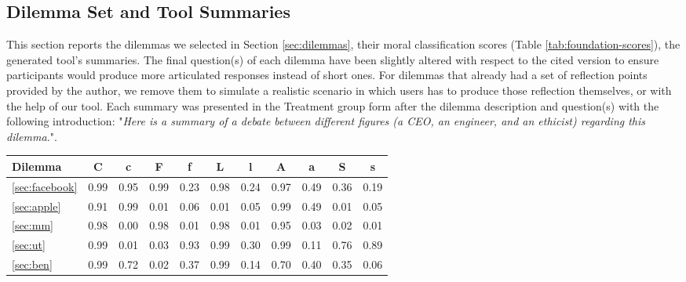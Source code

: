 \subsection{Dilemma Set and Tool Summaries}
\label{sec:selected_dilemmas}

This section reports the dilemmas we selected in Section \ref{sec:dilemmas}, their moral classification scores (Table \ref{tab:foundation-scores}), the generated tool's summaries.
The final question(s) of each dilemma have been slightly altered with respect to the cited version to ensure participants would produce more articulated responses instead of short ones. For dilemmas that already had a set of reflection points provided by the author, we remove them to simulate a realistic scenario in which users has to produce those reflection themselves, or with the help of our tool.
Each summary was presented in the Treatment group form after the dilemma description and question(s) with the following introduction: "\textit{Here is a summary of a debate between different figures (a CEO, an engineer, and an ethicist) regarding this dilemma.}".

\begin{table*}[t]
  \centering
  \caption{Moral classification scores for the selected dilemmas (rounded to two decimal digits). Each moral foundation can be present in the form of \textit{virtue} or \textit{vice}: capital letters represent the virtue label, lowercase letters represent the vice. Legend: Care (c), Fairness (f), Loyalty (l), Authority (a), Sanctity (s).}
  \begin{tabular}{lcccccccccc}
    \toprule
    \textbf{Dilemma} & \textbf{C} & \textbf{c} & \textbf{F} & \textbf{f} & \textbf{L} & \textbf{l} & \textbf{A} & \textbf{a} & \textbf{S} & \textbf{s} \\
    \midrule
    \ref{sec:facebook} & 0.99 & 0.95 & 0.99 & 0.23 & 0.98 & 0.24 & 0.97 & 0.49 & 0.36 & 0.19 \\
    \ref{sec:apple} & 0.91 & 0.99 & 0.01 & 0.06 & 0.01 & 0.05 & 0.99 & 0.49 & 0.01 & 0.05 \\
    \ref{sec:mm} & 0.98 & 0.00 & 0.98 & 0.01 & 0.98 & 0.01 & 0.95 & 0.03 & 0.02 & 0.01 \\
    \ref{sec:ut} & 0.99 & 0.01 & 0.03 & 0.93 & 0.99 & 0.30 & 0.99 & 0.11 & 0.76 & 0.89 \\
    \ref{sec:ben} & 0.99 & 0.72 & 0.02 & 0.37 & 0.99 & 0.14 & 0.70 & 0.40 & 0.35 & 0.06 \\
    \bottomrule
  \end{tabular}
  \label{tab:foundation-scores}
\end{table*}

